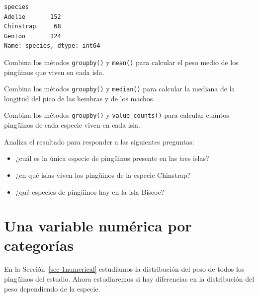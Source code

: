 \documentclass[
  a4paper,
  noprof,
  12pt,
  notoc,
  nosols,
  nobib]{mnye}
\providecommand{\tightlist}{%
  \setlength{\itemsep}{0pt}\setlength{\parskip}{0pt}}\usepackage{longtable,booktabs,array}
\renewenvironment{exercise}[1][]{
            \if\relax\detokenize{#1}\relax
                \ex
            \else
                \ex[note={#1}]
            \fi
        }{\endex}
\theoremstyle{definition}
\newtheorem{exercise}{Ejercicio}[section]
\theoremstyle{remark}
\begin{document}
\begin{verbatim}
species
Adelie       152
Chinstrap     68
Gentoo       124
Name: species, dtype: int64
\end{verbatim}

\begin{exercise}[]%
\protect\hypertarget{exr-groupby-mean}{}\label{exr-groupby-mean}%
Combina los métodos \texttt{groupby()} y \texttt{mean()} para calcular
el peso medio de los pingüinos que viven en cada isla.

\end{exercise}

\begin{exercise}[]%
\protect\hypertarget{exr-groupby-max}{}\label{exr-groupby-max}%
Combina los métodos \texttt{groupby()} y \texttt{median()} para calcular
la mediana de la longitud del pico de las hembras y de los machos.

\end{exercise}

\begin{exercise}[]%
\protect\hypertarget{exr-groupby-value_counts}{}\label{exr-groupby-value_counts}%
Combina los métodos \texttt{groupby()} y \texttt{value\_counts()} para
calcular cuántos pingüinos de cada especie viven en cada isla.

Analiza el resultado para responder a las siguientes preguntas:

\begin{itemize}
\tightlist
\item
  ¿cuál es la única especie de pingüinos presente en las tres islas?
\item
  ¿en qué islas viven los pingüinos de la especie Chinstrap?
\item
  ¿qué especies de pingüinos hay en la isla Biscoe?
\end{itemize}

\end{exercise}


\section{Una variable numérica por
categorías}\label{una-variable-numuxe9rica-por-categoruxedas}

En la Sección~\ref{sec-1numerical} estudiamos la distribución del peso
de todos los pingüinos del estudio. Ahora estudiaremos si hay
diferencias en la distribución del peso dependiendo de la especie.
\end{document}
